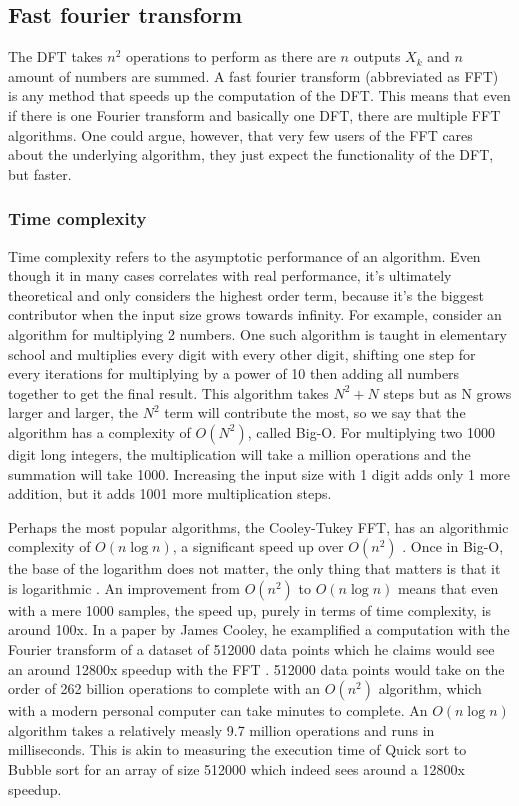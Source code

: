 \subsection{Fast fourier transform}
The DFT takes $n^2$ operations to perform as there are $n$ outputs $X_k$ and $n$ amount of numbers are summed. A fast fourier transform (abbreviated as FFT) is any method that speeds up the computation of the DFT. This means that even if there is one Fourier transform and basically one DFT, there are multiple FFT algorithms. One could argue, however, that very few users of the FFT cares about the underlying algorithm, they just expect the functionality of the DFT, but faster. 

\subsubsection{Time complexity}
Time complexity refers to the asymptotic performance of an algorithm. Even though it in many cases correlates with real performance, it's ultimately theoretical and only considers the highest order term, because it's the biggest contributor when the input size grows towards infinity. For example, consider an algorithm for multiplying 2 numbers. One such algorithm is taught in elementary school and multiplies every digit with every other digit, shifting one step for every iterations for multiplying by a power of 10 then adding all numbers together to get the final result. This algorithm takes $N^2+N$ steps but as N grows larger and larger, the $N^2$ term will contribute the most, so we say that the algorithm has a complexity of $O(N^2)$, called Big-O. For multiplying two 1000 digit long integers, the multiplication will take a million operations and the summation will take 1000. Increasing the input size with 1 digit adds only 1 more addition, but it adds 1001 more multiplication steps.

Perhaps the most popular algorithms, the Cooley-Tukey FFT, has an algorithmic complexity of $O(n \log n)$, a significant speed up over $O(n^2)$ \cite{Randhawa2018} \cite{HeidemanEtAl1984}. Once in Big-O, the base of the logarithm does not matter, the only thing that matters is that it is logarithmic . An improvement from $O(n^2)$ to $O(n \log n)$ means that even with a mere 1000 samples, the speed up, purely in terms of time complexity, is around 100x. In a paper by James Cooley, he examplified a computation with the Fourier transform of a dataset of 512000 data points which he claims would see an around 12800x speedup with the FFT \cite{Cooley1987}. 512000 data points would take on the order of 262 billion operations to complete with an $O(n^2)$ algorithm, which with a modern personal computer can take minutes to complete. An $O(n \log n)$ algorithm takes a relatively measly 9.7 million operations and runs in milliseconds. This is akin to measuring the execution time of Quick sort to Bubble sort for an array of size 512000 which indeed sees around a 12800x speedup.

